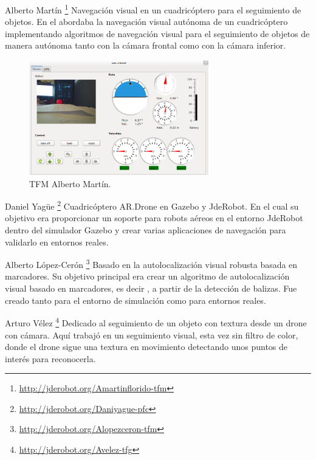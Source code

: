 \hspace{1cm} Alberto Martín \footnote{\url{http://jderobot.org/Amartinflorido-tfm}} \cite{AlbertoMartin} Navegación visual en un cuadricóptero para el seguimiento de objetos. En el abordaba la navegación visual autónoma de un cuadricóptero implementando algoritmos de navegación visual para el seguimiento de objetos de manera autónoma tanto con la cámara frontal como con la cámara inferior.
\\

\begin{figure}[H]
	\begin{center}
		\includegraphics[width=0.7\textwidth]{imag/IMG8.png}
				\caption{TFM Alberto Martín.} 
	\label{fig:TFM Alberto M.}	
	\end{center}
\end{figure}

\hspace{1cm} Daniel Yagüe  \footnote{\url{http://jderobot.org/Daniyague-pfc}} \cite{DanielYague} Cuadricóptero AR.Drone en Gazebo y JdeRobot. En el cual su objetivo era proporcionar un soporte para robots aéreos en el entorno JdeRobot dentro del simulador Gazebo y crear varias aplicaciones de navegación para validarlo en entornos reales.

\hspace{1cm} Alberto López-Cerón \footnote{\url{http://jderobot.org/Alopezceron-tfm}} \cite{AlbertoLopez} Basado en la autolocalización visual robusta basada en marcadores. Su objetivo principal era crear un algoritmo de autolocalización visual basado en marcadores, es decir , a partir de la detección de balizas. Fue creado tanto para el entorno de simulación como para entornos reales.

\hspace{1cm} Arturo Vélez \footnote{\url{http://jderobot.org/Avelez-tfg}} \cite{ArturoVelez} Dedicado al seguimiento de un objeto con textura desde un drone con
cámara. Aquí trabajó en un seguimiento visual, esta vez sin filtro de color, donde el drone sigue una textura en movimiento detectando unos puntos de interés para reconocerla.

